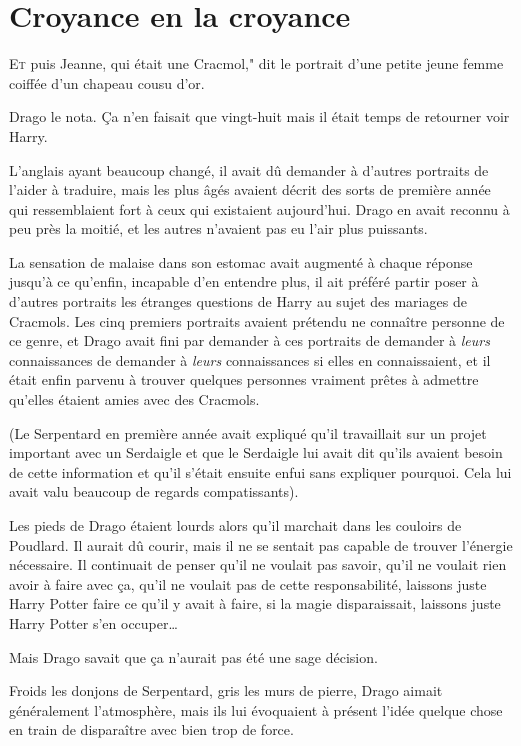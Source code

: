 \chapter{Croyance en la croyance}

\lettrine[ante=<<~]{E}{t} puis Jeanne, qui était une Cracmol," dit le portrait d'une petite jeune femme coiffée d'un chapeau cousu d'or.

Drago le nota. Ça n'en faisait que vingt-huit mais il était temps de retourner voir Harry.

L'anglais ayant beaucoup changé, il avait dû demander à d'autres portraits de l'aider à traduire, mais les plus âgés avaient décrit des sorts de première année qui ressemblaient fort à ceux qui existaient aujourd'hui. Drago en avait reconnu à peu près la moitié, et les autres n'avaient pas eu l'air plus puissants.

La sensation de malaise dans son estomac avait augmenté à chaque réponse jusqu'à ce qu'enfin, incapable d'en entendre plus, il ait préféré partir poser à d'autres portraits les étranges questions de Harry au sujet des mariages de Cracmols. Les cinq premiers portraits avaient prétendu ne connaître personne de ce genre, et Drago avait fini par demander à ces portraits de demander à \emph{leurs} connaissances de demander à \emph{leurs} connaissances si elles en connaissaient, et il était enfin parvenu à trouver quelques personnes vraiment prêtes à admettre qu'elles étaient amies avec des Cracmols.

(Le Serpentard en première année avait expliqué qu'il travaillait sur un projet important avec un Serdaigle et que le Serdaigle lui avait dit qu'ils avaient besoin de cette information et qu'il s'était ensuite enfui sans expliquer pourquoi. Cela lui avait valu beaucoup de regards compatissants).

Les pieds de Drago étaient lourds alors qu'il marchait dans les couloirs de Poudlard. Il aurait dû courir, mais il ne se sentait pas capable de trouver l'énergie nécessaire. Il continuait de penser qu'il ne voulait pas savoir, qu'il ne voulait rien avoir à faire avec ça, qu'il ne voulait pas de cette responsabilité, laissons juste Harry Potter faire ce qu'il y avait à faire, si la magie disparaissait, laissons juste Harry Potter s'en occuper…

Mais Drago savait que ça n'aurait pas été une sage décision.

Froids les donjons de Serpentard, gris les murs de pierre, Drago aimait généralement l'atmosphère, mais ils lui évoquaient à présent l'idée quelque chose en train de disparaître avec bien trop de force.

